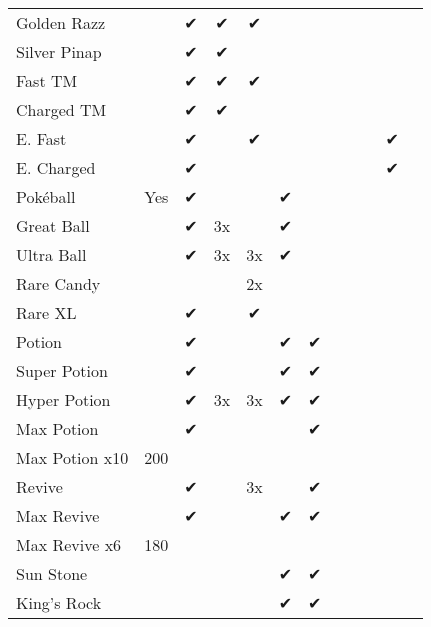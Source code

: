 \begin{table}
\begin{tabular}{p{}ccccccccccc}
Golden Razz       &      & ✔ & ✔         & ✔  &    &     &     &     &   &   &   \\
Silver Pinap      &      & ✔ & ✔         &    &    &     &     &     &   &   &   \\
Fast TM           &      & ✔ & ✔         & ✔  &    &     &     &     &   &   &   \\
Charged TM        &      & ✔ & ✔         &    &    &     &     &     &   &   &   \\
E. Fast           &      & ✔ &           & ✔  &    &     &     &     &   & ✔ &   \\
E. Charged        &      & ✔ &           &    &    &     &     &     &   & ✔ &   \\
Pokéball          & Yes  & ✔ &           &    &  ✔ &     &     &     &   &   &   \\
Great Ball        &      & ✔ & 3x        &    &  ✔ &     &     &     &   &   &   \\
Ultra Ball        &      & ✔ & 3x        & 3x &  ✔ &     &     &     &   &   &   \\
Rare Candy        &      &   &           & 2x &    &     &     &     &   &   &   \\
Rare XL           &      & ✔ &           & ✔  &    &     &     &     &   &   &   \\
Potion            &      & ✔ &           &    &  ✔ &  ✔  &     &     &   &   &   \\
Super Potion      &      & ✔ &           &    &  ✔ &  ✔  &     &     &   &   &   \\
Hyper Potion      &      & ✔ & 3x        & 3x &  ✔ &  ✔  &     &     &   &   &   \\
Max Potion        &      & ✔ &           &    &    &  ✔  &     &     &   &   &   \\
Max Potion x10    & 200  &   &           &    &    &     &     &     &   &   &   \\
Revive            &      & ✔ &           & 3x &    &  ✔  &     &     &   &   &   \\
Max Revive        &      & ✔ &           &    &  ✔ &  ✔  &     &     &   &   &   \\
Max Revive x6     & 180  &   &           &    &    &     &     &     &   &   &   \\
Sun Stone         &      &   &           &    &  ✔ &  ✔  &     &     &   &   &   \\
King's Rock       &      &   &           &    &  ✔ &  ✔  &     &     &   &   &   \\

\end{tabular}
\end{table}
